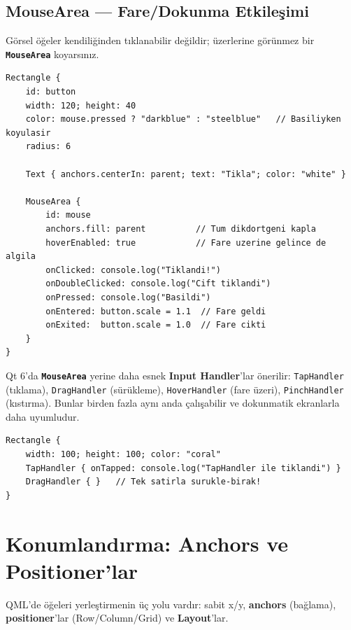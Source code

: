 \documentclass[11pt,a4paper]{article}
\newcommand{\kls}[1]{\texttt{\color{anaMavi}\textbf{#1}}}
\newcommand{\kod}[1]{\texttt{\color{koyuGri}#1}}
\begin{document}
\subsection{MouseArea — Fare/Dokunma Etkileşimi}

Görsel öğeler kendiliğinden tıklanabilir değildir; üzerlerine görünmez bir
\kls{MouseArea} koyarsınız.

\begin{lstlisting}
Rectangle {
    id: button
    width: 120; height: 40
    color: mouse.pressed ? "darkblue" : "steelblue"   // Basiliyken koyulasir
    radius: 6

    Text { anchors.centerIn: parent; text: "Tikla"; color: "white" }

    MouseArea {
        id: mouse
        anchors.fill: parent          // Tum dikdortgeni kapla
        hoverEnabled: true            // Fare uzerine gelince de algila
        onClicked: console.log("Tiklandi!")
        onDoubleClicked: console.log("Cift tiklandi")
        onPressed: console.log("Basildi")
        onEntered: button.scale = 1.1  // Fare geldi
        onExited:  button.scale = 1.0  // Fare cikti
    }
}
\end{lstlisting}

\begin{notkutu}
Qt 6'da \kls{MouseArea} yerine daha esnek \textbf{Input Handler}'lar önerilir:
\kod{TapHandler} (tıklama), \kod{DragHandler} (sürükleme), \kod{HoverHandler}
(fare üzeri), \kod{PinchHandler} (kıstırma). Bunlar birden fazla aynı anda
çalışabilir ve dokunmatik ekranlarla daha uyumludur.
\end{notkutu}

\begin{lstlisting}
Rectangle {
    width: 100; height: 100; color: "coral"
    TapHandler { onTapped: console.log("TapHandler ile tiklandi") }
    DragHandler { }   // Tek satirla surukle-birak!
}
\end{lstlisting}

\section{Konumlandırma: Anchors ve Positioner'lar}

QML'de öğeleri yerleştirmenin üç yolu vardır: sabit x/y, \textbf{anchors}
(bağlama), \textbf{positioner}'lar (Row/Column/Grid) ve \textbf{Layout}'lar.
\end{document}
